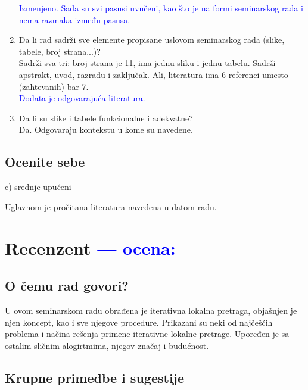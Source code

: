 \documentclass[a4paper]{report}
\newcommand{\odgovor}[1]{\textcolor{blue}{#1}}
\begin{document}
\begin{enumerate}
\odgovor{Izmenjeno. Sada su svi pasusi uvučeni, kao što je na formi seminarskog rada i nema razmaka između pasusa.\\}
\item Da li rad sadrži sve elemente propisane uslovom seminarskog rada (slike, tabele, broj strana...)?\\
Sadrži sva tri: broj strana je 11, ima jednu sliku i jednu tabelu. Sadrži apstrakt, uvod, razradu i zaključak. Ali, literatura ima 6 referenci umesto (zahtevanih) bar 7.\\
\odgovor{Dodata je odgovarajuća literatura.\\}

\item Da li su slike i tabele funkcionalne i adekvatne?\\
Da. Odgovaraju kontekstu u kome su navedene.
\end{enumerate}

\section{Ocenite sebe}
c) srednje upućeni

Uglavnom je pročitana literatura navedena u datom radu.

\chapter{Recenzent \odgovor{--- ocena:} }


\section{O čemu rad govori?}

U ovom seminarskom radu obrađena je iterativna lokalna pretraga, objašnjen je njen koncept, kao i  sve njegove procedure. Prikazani su neki od najčešćih problema i načina rešenja primene iterativne lokalne pretrage. Upoređen je sa ostalim sličnim alogirtmima, njegov značaj i budućnost.

\section{Krupne primedbe i sugestije}
\end{document}
